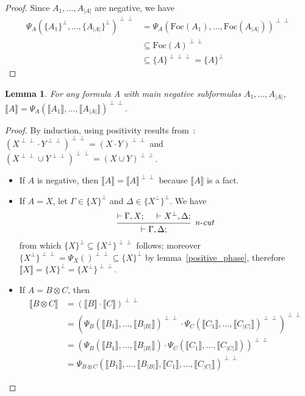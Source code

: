 \documentclass{article}
\newtheorem{lemma}[theorem]{Lemma}
\newcommand\size[1]{{\lvert #1 \rvert}}
\newcommand\sem[1]{{\llbracket #1 \rrbracket}}
\newcommand\biperp{{\perp\perp}}
\newcommand\triperp{{\perp\perp\perp}}
\newcommand\Foc{\text{Foc}}
\begin{document}
\begin{proof}
    Since $A_1, \dots, A_\size{A}$ are negative, we have \begin{align*}
        \Psi_A(\{A_1\}^\perp, \dots, \{A_\size{A}\}^\perp)^\biperp &= \Psi_A(\Foc(A_1), \dots, \Foc(A_\size{A}))^\biperp \\
        &\subseteq \Foc(A)^\biperp \\
        &\subseteq \{A\}^\triperp = \{A\}^\perp
    \end{align*}
\end{proof}

\begin{lemma}
    \label{positivity}
    For any formula A with main negative subformulas $A_1, \dots, A_\size{A}$, $\sem{A} = \Psi_A(\sem{A_1}, \dots, \sem{A_\size{A}})^\biperp$.
\end{lemma}
\begin{proof}
    By induction, using positivity results from~\cite[appendix F]{girard}: $(X^\biperp \cdot Y^\biperp)^\biperp = (X \cdot Y)^\biperp$ and $(X^\biperp \cup Y^\biperp)^\biperp = (X \cup Y)^\biperp$.
    \begin{itemize}
        \item If $A$ is negative, then $\sem{A} = \sem{A}^\biperp$ because $\sem{A}$ is a fact.
        \item If $A = X$, let $\Gamma \in \{X\}^\perp$ and $\Delta \in \{X^\perp\}^\perp$. We have
        $$\begin{prooftree}
            \hypo{\vdash \Gamma, X;}
            \hypo{\vdash X^\perp, \Delta;}
            \infer2[\textit{n-cut}]{\vdash \Gamma, \Delta;}
        \end{prooftree}$$
        from which $\{X\}^\perp \subseteq \{X^\perp\}^\biperp$ follows; moreover $\{X^\perp\}^\biperp = \Psi_X()^\biperp \subseteq \{X\}^\perp$ by lemma~\ref{positive_phase}, therefore $\sem{X} = \{X\}^\perp = \{X^\perp\}^\biperp$.
        \item If $A = B \otimes C$, then \begin{align*}
            \sem{B \otimes C} &= (\sem{B} \cdot \sem{C})^\biperp \\
            &= (\Psi_B(\sem{B_1}, \dots, \sem{B_\size{B}})^\biperp \cdot \Psi_C(\sem{C_1}, \dots, \sem{C_\size{C}})^\biperp)^\biperp \\
            &= (\Psi_B(\sem{B_1}, \dots, \sem{B_\size{B}}) \cdot \Psi_C(\sem{C_1}, \dots, \sem{C_\size{C}}))^\biperp \\
            &= \Psi_{B \otimes C}(\sem{B_1}, \dots, \sem{B_\size{B}}, \sem{C_1}, \dots, \sem{C_\size{C}})^\biperp

\end{align*}
\end{itemize}
\end{proof}
\end{document}
